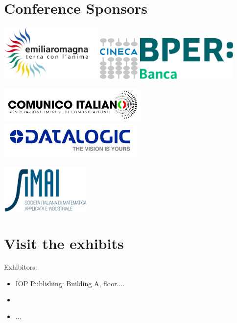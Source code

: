 \section*{Conference Sponsors}

\vspace{1cm}

\includegraphics[height=2.8cm]{images/logo_APT}    \hspace{1cm}
\includegraphics[height=2.2cm]{images/logo_CINECA} \hspace{1cm}
\includegraphics[height=2.2cm]{images/logo_BPER}

\vspace{1cm}

\includegraphics[height=1.8cm]{images/logo_TIPO}
\includegraphics[height=1.8cm]{images/logo_DATALOGIC}

\vspace{1cm}

\includegraphics[height=2.5cm]{images/logo_SIMAI}


\section*{Visit the exhibits}
Exhibitors:
\begin{itemize}
\item IOP Publishing: Building A, floor....
\item
\item ...
\end{itemize}
